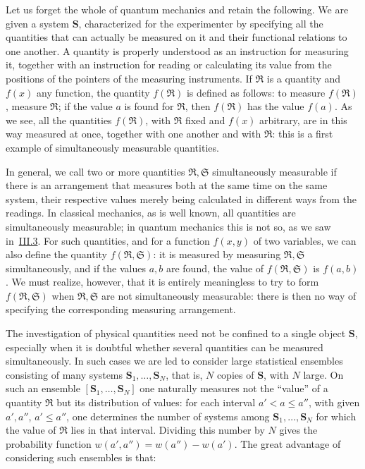 \documentclass[fontsize=13pt,twoside,openany,headings=normal,parskip=false,bookmarkpackage=false,DIV=calc]{scrbook}
\begin{document}
Let us forget the whole of quantum mechanics and retain the following. We are given a system $\boldsymbol{S}$, characterized for the experimenter by specifying all the quantities that can actually be measured on it and their functional relations to one another. A quantity is properly understood as an instruction for measuring it, together with an instruction for reading or calculating its value from the positions of the pointers of the measuring instruments. If $\mathfrak R$ is a quantity and $f(x)$ any function, the quantity $f(\mathfrak R)$ is defined as follows: to measure $f(\mathfrak R)$, measure $\mathfrak R$; if the value $a$ is found for $\mathfrak R$, then $f(\mathfrak R)$ has the value $f(a)$. As we see, all the quantities $f(\mathfrak R)$, with $\mathfrak R$ fixed and $f(x)$ arbitrary, are in this way measured at once, together with one another and with $\mathfrak R$: this is a first example of simultaneously measurable quantities.

In general, we call two or more quantities $\mathfrak R,\mathfrak S$ simultaneously measurable if there is an arrangement that measures both at the same time on the same system, their respective values merely being calculated in different ways from the readings. In classical mechanics, as is well known, all quantities are simultaneously measurable; in quantum mechanics this is not so, as we saw in~\hyperref[sec:III.3]{III.3}. For such quantities, and for a function $f(x,y)$ of two variables, we can also define the quantity $f(\mathfrak R,\mathfrak S)$: it is measured by measuring $\mathfrak R,\mathfrak S$ simultaneously, and if the values $a,b$ are found, the value of $f(\mathfrak R,\mathfrak S)$ is $f(a,b)$. We must realize, however, that it is entirely meaningless to try to form $f(\mathfrak R,\mathfrak S)$ when $\mathfrak R,\mathfrak S$ are not simultaneously measurable: there is then no way of specifying the corresponding measuring arrangement.

The investigation of physical quantities need not be confined to a single object $\boldsymbol{S}$, especially when it is doubtful whether several quantities can be measured simultaneously. In such cases we are led to consider large statistical ensembles consisting of many systems $\boldsymbol{S}_1,\ldots,\boldsymbol{S}_N$, that is, $N$ copies of $\boldsymbol{S}$, with $N$ large. On such an ensemble $[\boldsymbol{S}_1,\ldots,\boldsymbol{S}_N]$ one naturally measures not the ``value'' of a quantity $\mathfrak R$ but its distribution of values: for each interval $a'<a\leq a''$,
\hypertarget{origpage-159}{}%
with given $a',a''$, $a'\leq a''$, one determines the number of systems among $\boldsymbol{S}_1,\ldots,\boldsymbol{S}_N$ for which the value of $\mathfrak R$ lies in that interval. Dividing this number by $N$ gives the probability function $w(a',a'')=w(a'')-w(a')$. The great advantage of considering such ensembles is that:
\end{document}
